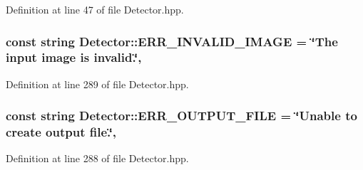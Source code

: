 Definition at line 47 of file Detector.\-hpp.

\hypertarget{classmultiscale_1_1analysis_1_1Detector_aa5dc8982745f567379e0eccd416c6820}{
\subsubsection[{E\-R\-R\-\_\-\-I\-N\-V\-A\-L\-I\-D\-\_\-\-I\-M\-A\-G\-E}]{\setlength{\rightskip}{0pt plus 5cm}const string Detector\-::\-E\-R\-R\-\_\-\-I\-N\-V\-A\-L\-I\-D\-\_\-\-I\-M\-A\-G\-E = \char`\"{}The input {\bf image} is invalid.\char`\"{}\hspace{0.3cm}{\ttfamily [static]}, {\ttfamily [protected]}}}\label{classmultiscale_1_1analysis_1_1Detector_aa5dc8982745f567379e0eccd416c6820}


Definition at line 289 of file Detector.\-hpp.

\hypertarget{classmultiscale_1_1analysis_1_1Detector_aab6b3a68e93cad9a93885e52f1c2ce04}{
\subsubsection[{E\-R\-R\-\_\-\-O\-U\-T\-P\-U\-T\-\_\-\-F\-I\-L\-E}]{\setlength{\rightskip}{0pt plus 5cm}const string Detector\-::\-E\-R\-R\-\_\-\-O\-U\-T\-P\-U\-T\-\_\-\-F\-I\-L\-E = \char`\"{}Unable to create output file.\char`\"{}\hspace{0.3cm}{\ttfamily [static]}, {\ttfamily [protected]}}}\label{classmultiscale_1_1analysis_1_1Detector_aab6b3a68e93cad9a93885e52f1c2ce04}


Definition at line 288 of file Detector.\-hpp.

